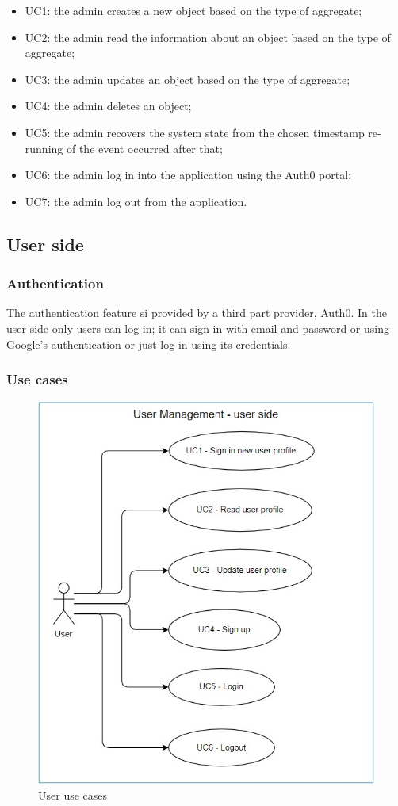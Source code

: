 \begin{itemize}
	\item UC1: the admin creates a new object based on the type of aggregate;
	\item UC2: the admin read the information about an object based on the type of aggregate;
	\item UC3: the admin updates an object based on the type of aggregate;
	\item UC4: the admin deletes an object;
	\item UC5: the admin recovers the system state from the chosen timestamp re-running of the event occurred after that; 
	\item UC6: the admin log in into the application using the Auth0 portal;
	\item UC7: the admin log out from the application.
\end{itemize}
	

\subsection{User side}
\subsubsection{Authentication}
The authentication feature si provided by a third part provider, Auth0. In the user side only users can log in; it can sign in with email and password or using Google's authentication or just log in using its credentials.
\subsubsection{Use cases}

\begin{figure} [H]
	\centering
	\includegraphics[scale=1.2]{../Img/UC_user}
	\caption{User use cases}\label{}
\end{figure}

